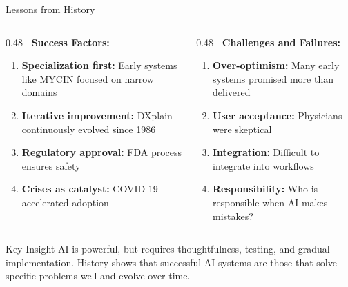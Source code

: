 \documentclass[aspectratio=169, 10pt]{beamer}
\begin{document}
\begin{frame}{Lessons from History}

    \begin{columns}
        \begin{column}{0.48\textwidth}
            \textbf{\faCheckCircle\ Success Factors:}
            \begin{enumerate}
                \item \textbf{Specialization first:} Early systems like MYCIN focused on narrow domains
                \item \textbf{Iterative improvement:} DXplain continuously evolved since 1986
                \item \textbf{Regulatory approval:} FDA process ensures safety
                \item \textbf{Crises as catalyst:} COVID-19 accelerated adoption
            \end{enumerate}
        \end{column}

        \begin{column}{0.48\textwidth}
            \textbf{\faExclamationTriangle\ Challenges and Failures:}
            \begin{enumerate}
                \item \textbf{Over-optimism:} Many early systems promised more than delivered
                \item \textbf{User acceptance:} Physicians were skeptical
                \item \textbf{Integration:} Difficult to integrate into workflows
                \item \textbf{Responsibility:} Who is responsible when AI makes mistakes?
            \end{enumerate}
        \end{column}
    \end{columns}

    \vspace{3mm}
    \begin{block}{\footnotesize Key Insight}
        \footnotesize
        AI is powerful, but requires thoughtfulness, testing, and gradual implementation. History shows that successful AI systems are those that solve specific problems well and evolve over time.
    \end{block}

\end{frame}
\end{document}

